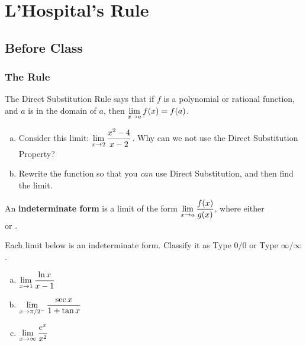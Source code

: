 \documentclass[notes]{subfiles}
\begin{document}
	\fancyhead[LO,RE]{\bfseries \small \currentname}
	\fancyfoot[C]{{}}
	\fancyfoot[LO,RE]{\large \thepage}	%
	
\section*{L'Hospital's Rule}\label{cs48}
	\subsection*{Before Class}
	\subsubsection*{The Rule}
		\begin{question}
			The Direct Substitution Rule says that if \(f\) is a polynomial or rational function, and \(a\) is in the domain of \(a\), then \(\displaystyle \lim_{x\to a} f(x) = f(a)\).
			\begin{enumerate}[(a)]
				\item Consider this limit: \(\displaystyle \lim_{x\to 2} \dfrac{x^2-4}{x-2}\).  Why can we not use the Direct Substitution Property?
					
				\item Rewrite the function so that you \emph{can} use Direct Substitution, and then find the limit.
			\end{enumerate}
		\end{question}
		
		\begin{defn}
			An \textbf{indeterminate form} is a limit of the form \(\displaystyle \lim_{x\to a} \dfrac{f(x)}{g(x)}\), where either \\[20pt]  or .
		\end{defn}
		
		\begin{ex}
			Each limit below is an indeterminate form.  Classify it as Type \(0/0\) or Type \(\infty/\infty\).
			\begin{enumerate}[(a)]
				\item \(\displaystyle\lim_{x\to 1} \dfrac{\ln x}{x - 1}\)
				\item\(\displaystyle \lim_{x\to \pi/2^-} \dfrac{\sec x}{1+\tan x}\)
				\item \(\displaystyle \lim_{x\to \infty} \dfrac{e^x}{x^2}\)
			\end{enumerate}
		\end{ex}
			\newpage
		
\end{document}
